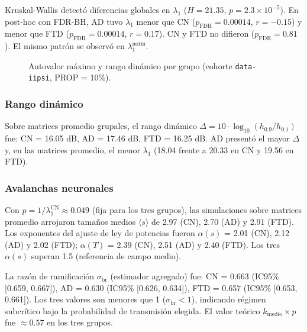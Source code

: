 \documentclass[12pt,a4paper]{article}
\begin{document}
Kruskal-Wallis detectó diferencias globales en $\lambda_1$ ($H = 21.35$, $p = 2.3 \times 10^{-5}$).
En post-hoc con FDR-BH, AD tuvo $\lambda_1$ menor que CN ($p_{\text{FDR}} = 0.00014$,
$r = -0.15$) y menor que FTD ($p_{\text{FDR}} = 0.00014$, $r = 0.17$). CN y FTD no
difieron ($p_{\text{FDR}} = 0.81$). El mismo patrón se observó en $\lambda_1^{\text{norm}}$.

\begin{figure}[H]
  \centering
  \caption{Autovalor máximo y rango dinámico por grupo (cohorte \texttt{data-iipsi},
  PROP = 10\%).}
  \label{fig:lambda1}
\end{figure}

\subsubsection{Rango dinámico}

Sobre matrices promedio grupales, el rango dinámico $\Delta = 10 \cdot \log_{10}(h_{0.9}/h_{0.1})$
fue: CN = 16.05 dB, AD = 17.46 dB, FTD = 16.25 dB. AD presentó el mayor $\Delta$ y, en las
matrices promedio, el menor $\lambda_1$ (18.04 frente a 20.33 en CN y 19.56 en FTD).

\subsubsection{Avalanchas neuronales}

Con $p = 1/\lambda_1^{\text{CN}} \approx 0.049$ (fija para los tres grupos), las simulaciones
sobre matrices promedio arrojaron tamaños medios $\langle s \rangle$ de 2.97 (CN), 2.70 (AD) y
2.91 (FTD). Los exponentes del ajuste de ley de potencias fueron $\alpha(s)$ = 2.01 (CN), 2.12
(AD) y 2.02 (FTD); $\alpha(T)$ = 2.39 (CN), 2.51 (AD) y 2.40 (FTD). Los tres $\alpha(s)$
superan 1.5 (referencia de campo medio).

La razón de ramificación $\sigma_{\text{br}}$ (estimador agregado) fue: CN = 0.663
(IC95\% [0.659, 0.667]), AD = 0.630 (IC95\% [0.626, 0.634]), FTD = 0.657
(IC95\% [0.653, 0.661]). Los tres valores son menores que 1 ($\sigma_{\text{br}} < 1$),
indicando régimen subcrítico bajo la probabilidad de transmisión elegida. El valor teórico
$k_{\text{medio}} \times p$ fue $\approx 0.57$ en los tres grupos.
\end{document}
